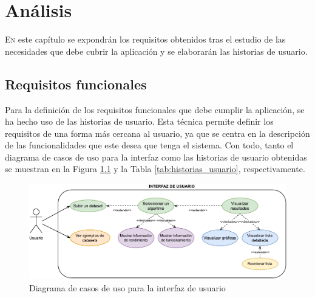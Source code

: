 \chapter{Análisis}
\label{chap:analisis}

\lettrine{E}{n} este capítulo se expondrán los requisitos obtenidos tras el estudio de las necesidades que debe cubrir la aplicación
y se elaborarán las historias de usuario.

\section{Requisitos funcionales}
\label{sec:analisis_requisitos_funcionales}

Para la definición de los requisitos funcionales que debe cumplir la aplicación, se ha hecho uso de las historias de usuario.
Esta técnica permite definir los requisitos de una forma más cercana al usuario, ya que se centra en la descripción
de las funcionalidades que este desea que tenga el sistema. Con todo, tanto el diagrama de casos de uso para la interfaz
como las historias de usuario obtenidas se muestran en la Figura \ref{fig:casos_uso} y la Tabla \ref{tab:historias_usuario}, respectivamente.

\bigskip
\begin{figure}[H]
	\centering
	\includegraphics[width=\textwidth]{diagramas/usecases.pdf}
	\caption{Diagrama de casos de uso para la interfaz de usuario}
	\label{fig:casos_uso}
\end{figure}


